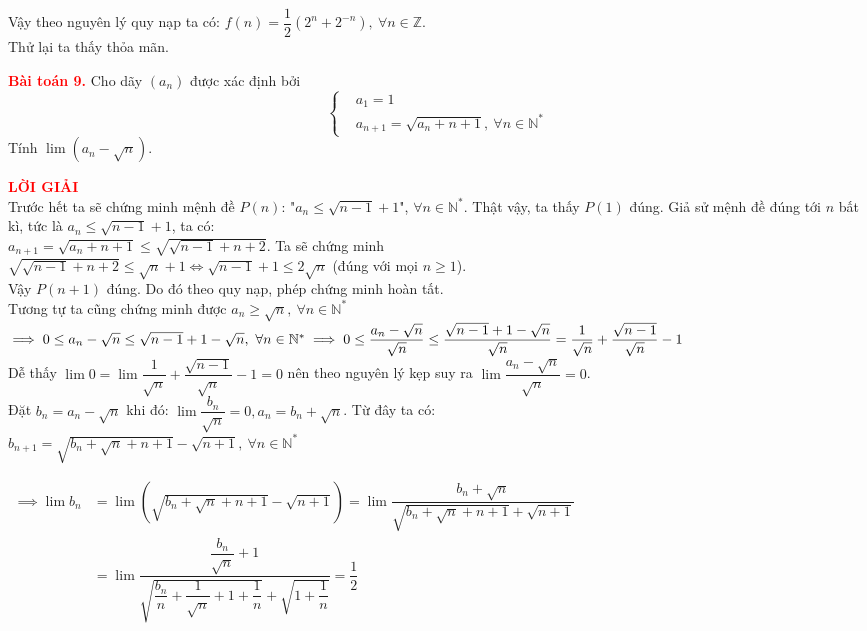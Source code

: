 \documentclass[a4paper, 12pt]{article}
\numberwithin{equation}{section}
\begin{document}
    Vậy theo nguyên lý quy nạp ta có: $f(n) = \dfrac{1}{2}\left(2^n + 2^{-n}\right), \ \forall n \in \mathbb{Z}$.\\
    Thử lại ta thấy thỏa mãn.
    \newpage
    \begin{BoxRed}
	\textbf{\textcolor{red}{Bài toán 9.}} 
         Cho dãy $(a_n)$ được xác định bởi
	\[ \left\{
	\begin{aligned}
		&a_1 = 1 \\
		&a_{n+1} = \sqrt{a_n + n + 1}, \ \forall n \in \mathbb{N}^*
	\end{aligned}
	\right. \]
    Tính $\lim \left(a_n - \sqrt{n}\right)$.
	\end{BoxRed}
	\textbf{\textcolor{red}{LỜI GIẢI}} \\
    Trước hết ta sẽ chứng minh mệnh đề $P(n)$: "$a_n \leq \sqrt{n-1} + 1$", $\forall n \in \mathbb{N^*}$. Thật vậy, ta thấy $P(1)$ đúng. Giả sử mệnh đề đúng tới $n$ bất kì, tức là $a_n \leq \sqrt{n-1} + 1$, ta có:\\
    $a_{n+1} = \sqrt{a_n + n + 1} \leq \sqrt{\sqrt{n-1}+n+2}$. Ta sẽ chứng minh \\
    $\sqrt{\sqrt{n-1}+n+2} \leq \sqrt{n} + 1 \iff \sqrt{n-1}+1\leq 2\sqrt{n}$ (đúng với mọi $n\geq 1$).\\
    Vậy $P(n+1)$ đúng. Do đó theo quy nạp, phép chứng minh hoàn tất.\\
    Tương tự ta cũng chứng minh được $a_n \geq \sqrt{n}, \ \forall n \in \mathbb{N^*}$\\
    $\implies 0 \leq a_n - \sqrt{n} \leq \sqrt{n-1} + 1 - \sqrt{n}, \ \forall n \in \mathbb{N^*}\\
    \implies 0 \leq \dfrac{a_n - \sqrt{n}}{\sqrt{n}} \leq \dfrac{\sqrt{n-1} + 1 - \sqrt{n}}{\sqrt{n}} = \dfrac{1}{\sqrt{n}} + \dfrac{\sqrt{n-1}}{\sqrt{n}} - 1$\\
    Dễ thấy $\lim 0 = \lim \dfrac{1}{\sqrt{n}} + \dfrac{\sqrt{n-1}}{\sqrt{n}} - 1 = 0$ nên theo nguyên lý kẹp suy ra $\lim \dfrac{a_n - \sqrt{n}}{\sqrt{n}} = 0$.\\
    Đặt $b_n = a_n - \sqrt{n}$ khi đó: $\lim \dfrac{b_n}{\sqrt{n}} =0, a_n = b_n + \sqrt{n}$. Từ đây ta có:\\
    $b_{n+1} = \sqrt{b_n + \sqrt{n} + n + 1} -\sqrt{n+1}, \ \forall n \in \mathbb{N}^*$
    
	$\begin{aligned}
    \implies \lim b_n &= \lim\left(\sqrt{b_n + \sqrt{n} + n + 1} -\sqrt{n+1}\right) = \lim \dfrac{b_n + \sqrt{n}}{\sqrt{b_n + \sqrt{n} + n + 1} +\sqrt{n+1}}\\
                      &= \lim \dfrac{\dfrac{b_n}{\sqrt{n}}+1}{\sqrt{\dfrac{b_n}{n}+\dfrac{1}{\sqrt{n}}+1 + \dfrac{1}{n}}+ \sqrt{1 + \dfrac{1}{n}}} = \dfrac{1}{2}
	\end{aligned}$
    
\end{document}
